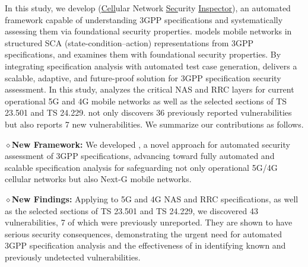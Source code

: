 In this study, we develop \lm (\ul{Cell}ular Network \ul{Sec}urity \ul{Inspector}), an automated framework capable of understanding 3GPP specifications and systematically assessing them via foundational security properties. \lm models mobile networks in structured SCA (state-condition–action) representations from 3GPP specifications, and examines them with foundational security properties. By integrating specification analysis with automated test case generation, \lm delivers a scalable, adaptive, and future-proof solution for 3GPP specification security assessment. In this study, \lm analyzes the critical NAS and RRC layers for current operational 5G and 4G mobile networks as well as the selected sections of TS 23.501 and TS 24.229. 
\lm not only discovers 36 previously reported vulnerabilities but also reports 7 new vulnerabilities.
We summarize our contributions as follows. 

\noindent $\diamond$\textbf{New Framework:} We developed \lm, a novel approach for automated security assessment of 3GPP specifications, advancing toward fully automated and scalable specification analysis for safeguarding not only operational 5G/4G cellular networks but also Next-G mobile networks.  

\noindent $\diamond$\textbf{New Findings:} Applying \lm to 5G and 4G NAS and RRC specifications, as well as the selected sections of TS 23.501 and TS 24.229, we discovered 43 vulnerabilities, 7 of which were previously unreported. They are shown to have serious security consequences, demonstrating the urgent need for automated 3GPP specification analysis and the effectiveness of \lm in identifying known and previously undetected vulnerabilities. 
